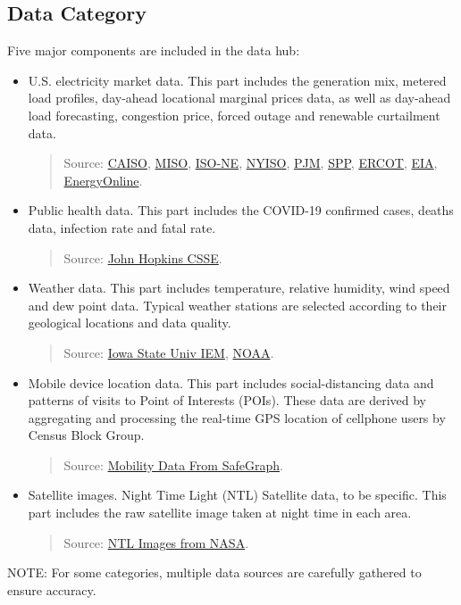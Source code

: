 \documentclass[10pt]{article}
\numberwithin{equation}{section}
\numberwithin{table}{section}
\numberwithin{figure}{section}
\begin{document}
\subsection{Data Category}
Five major components are included in the data hub: 
\begin{itemize}
	\item U.S. electricity market data. This part includes the generation mix, metered load profiles, day-ahead locational marginal prices data, as well as day-ahead load forecasting, congestion price, forced outage and renewable curtailment data.
    	\begin{quotation}
    	    Source: \href{http://oasis.caiso.com/mrioasis/logon.do}{CAISO}, \href{https://www.misoenergy.org/markets-and-operations/real-time--market-data/market-reports/}{MISO}, \href{https://www.iso-ne.com/markets-operations/iso-express}{ISO-NE}, \href{https://www.nyiso.com/energy-market-operational-data}{NYISO}, \href{https://dataminer2.pjm.com/list}{PJM}, \href{https://marketplace.spp.org/groups/operational_data}{SPP}, \href{http://www.ercot.com/}{ERCOT}, \href{https://www.eia.gov/beta/electricity/gridmonitor/dashboard/electric_overview/US48/US48}{EIA}, \href{http://www.energyonline.com/}{EnergyOnline}.
    	\end{quotation}
	\item Public health data. This part includes the COVID-19 confirmed cases, deaths data, infection rate and fatal rate.
    	\begin{quotation}
            Source: \href{https://github.com/CSSEGISandData/COVID-19}{John Hopkins CSSE}.
    	\end{quotation}
	\item Weather data. This part includes temperature, relative humidity, wind speed and dew point data. Typical weather stations are selected according to their geological locations and data quality.
        \begin{quotation}
            Source: \href{https://mesonet.agron.iastate.edu/request/download.phtml}{Iowa State Univ IEM}, \href{https://www.nws.noaa.gov/ost/asostech.html}{NOAA}.
        \end{quotation}
	\item Mobile device location data. This part includes social-distancing data and patterns of visits to Point of Interests (POIs). These data are derived by aggregating and processing the real-time GPS location of cellphone users by Census Block Group.
	    \begin{quotation}
	        Source: \href{https://docs.safegraph.com/docs}{Mobility Data From SafeGraph}.
	    \end{quotation}
	\item Satellite images. Night Time Light (NTL)	Satellite data, to be specific. This part includes the raw satellite image taken at night time in each area.
	    \begin{quotation}
	        Source: \href{https://ladsweb.modaps.eosdis.nasa.gov/missions-and-measurements/products/VNP46A1/}{NTL Images from NASA}.
	    \end{quotation}
\end{itemize}
NOTE: For some categories, multiple data sources are carefully gathered to ensure accuracy.
\end{document}
